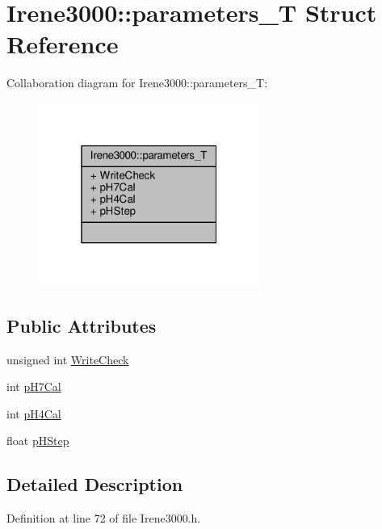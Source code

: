 \hypertarget{structIrene3000_1_1parameters__T}{}\section{Irene3000\+:\+:parameters\+\_\+T Struct Reference}
\label{structIrene3000_1_1parameters__T}


Collaboration diagram for Irene3000\+:\+:parameters\+\_\+T\+:
\nopagebreak
\begin{figure}[H]
\begin{center}
\leavevmode
\includegraphics[width=205pt]{structIrene3000_1_1parameters__T__coll__graph}
\end{center}
\end{figure}
\subsection*{Public Attributes}
\begin{DoxyCompactItemize}
\item 
unsigned int \hyperlink{structIrene3000_1_1parameters__T_a56f1f14d33a69300d580eda2dc52cecd}{Write\+Check}
\item 
int \hyperlink{structIrene3000_1_1parameters__T_a21265466a570d84bff914f26d2f7a03e}{p\+H7\+Cal}
\item 
int \hyperlink{structIrene3000_1_1parameters__T_a1144de6fb54eb3e1dd2a3d8c2afc97dc}{p\+H4\+Cal}
\item 
float \hyperlink{structIrene3000_1_1parameters__T_a61cfcc2539d5f630e9071f3753aba9fe}{p\+H\+Step}
\end{DoxyCompactItemize}


\subsection{Detailed Description}


Definition at line 72 of file Irene3000.\+h.



